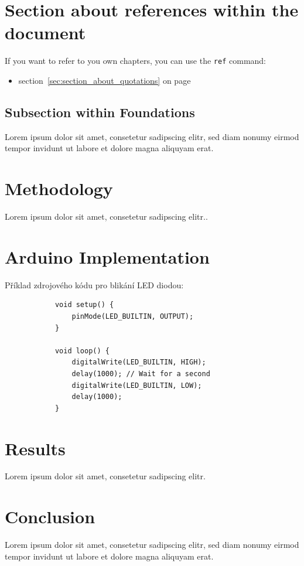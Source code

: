 \documentclass[a4paper]{article}
\begin{document}
	\section{Section about references within the document}
	\label{sec:section_about_references_within_the_document}
	
	If you want to refer to you own chapters, you can use the \texttt{ref} command:
	\begin{itemize}
		\item section~\ref{sec:section_about_quotations} on page \pageref{sec:section_about_quotations}
	\end{itemize} 
	
	\subsection{Subsection within Foundations}
	Lorem ipsum dolor sit amet, consetetur sadipscing elitr, sed diam nonumy eirmod tempor invidunt ut labore et dolore magna aliquyam erat.
	
	\section{Methodology}
	\label{sec:methodology}
	Lorem ipsum dolor sit amet, consetetur sadipscing elitr..
	
	\section{Arduino Implementation}
	Příklad zdrojového kódu pro blikání LED diodou:
	
	\begin{listing}[H]
		\begin{verbatim}
			void setup() {
				pinMode(LED_BUILTIN, OUTPUT);
			}
			
			void loop() {
				digitalWrite(LED_BUILTIN, HIGH);
				delay(1000); // Wait for a second
				digitalWrite(LED_BUILTIN, LOW);
				delay(1000); 
			}
		\end{verbatim}
		\caption{Základní Blink sketch pro Arduino}
		\label{lst:arduino_blink}
	\end{listing}
	
	\section{Results}
	\label{sec:results}
	Lorem ipsum dolor sit amet, consetetur sadipscing elitr.
	
	\section{Conclusion}
	\label{sec:conclusion}
	Lorem ipsum dolor sit amet, consetetur sadipscing elitr, sed diam nonumy eirmod tempor invidunt ut labore et dolore magna aliquyam erat.
	
	\newpage 
	
	
	 
	
\end{document}
